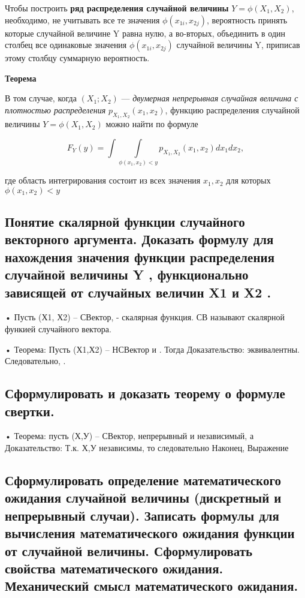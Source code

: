 Чтобы построить \textbf{ряд распределения случайной величины} $Y = \phi(X_1, X_2)$, необходимо, не учитывать все те значения $\phi(x_{1i}, x_{2j})$, вероятность принять которые случайной величине Y равна нулю, а во-вторых, объединить в один столбец все одинаковые значения $\phi(x_{1i}, x_{2j})$ случайной величины Y, приписав этому столбцу суммарную вероятность.

\textbf{Теорема}

В том случае, когда $(X_1; X_2)$ --- \textit{двумерная непрерывная случайная величина с плотностью распределения} $p_{X_1, X_2}(x_1, x_2)$, функцию распределения случайной величины $Y = \phi(X_1, X_2)$ можно найти по формуле

\begin{equation}
	F_Y(y) = \int\int\limits_{\phi(x_1, x_2) < y} p_{X_1, X_2}(x_1, x_2)dx_1dx_2, 
\end{equation}

где область интегрирования состоит из всех значения $x_1, x_2$ для которых $\phi(x_1, x_2) < y$

\subsection{Понятие скалярной функции случайного векторного аргумента. Доказать формулу для нахождения значения функции распределения случайной величины Y , функционально зависящей от случайных величин X1 и X2 .}

• Пусть (Х1, Х2) – СВектор,  - скалярная функция. СВ  называют скалярной функией случайного вектора.

• Теорема: Пусть (Х1,Х2) – НСВектор и . Тогда 
Доказательство:  эквивалентны. Следовательно, .


\subsection{Сформулировать и доказать теорему о формуле свертки.}

• Теорема: пусть (Х,У) – СВектор, непрерывный и независимый, а 
Доказательство:  Т.к. Х,У независимы, то  следовательно 
Наконец, 
Выражение 



\subsection{Сформулировать определение математического ожидания случайной величины (дискретный и непрерывный случаи). Записать формулы для вычисления математического ожидания функции от случайной величины. Сформулировать свойства математического ожидания. Механический смысл математического ожидания.}


